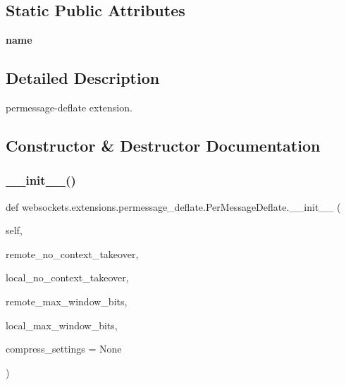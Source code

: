 \subsection*{Static Public Attributes}
\begin{DoxyCompactItemize}
\item 
\mbox{\label{classwebsockets_1_1extensions_1_1permessage__deflate_1_1_per_message_deflate_ab265c97dca6d0d7fb8a12ccf98b4af31}} 
{\bfseries name}
\end{DoxyCompactItemize}


\subsection{Detailed Description}
\begin{DoxyVerb}permessage-deflate extension.\end{DoxyVerb}
 

\subsection{Constructor \& Destructor Documentation}
\mbox{\label{classwebsockets_1_1extensions_1_1permessage__deflate_1_1_per_message_deflate_a2e17b81a09635b8939bce43bf56274ef}} 
\subsubsection{\texorpdfstring{\+\_\+\+\_\+init\+\_\+\+\_\+()}{\_\_init\_\_()}}
{\footnotesize\ttfamily def websockets.\+extensions.\+permessage\+\_\+deflate.\+Per\+Message\+Deflate.\+\_\+\+\_\+init\+\_\+\+\_\+ (\begin{DoxyParamCaption}\item[{}]{self,  }\item[{}]{remote\+\_\+no\+\_\+context\+\_\+takeover,  }\item[{}]{local\+\_\+no\+\_\+context\+\_\+takeover,  }\item[{}]{remote\+\_\+max\+\_\+window\+\_\+bits,  }\item[{}]{local\+\_\+max\+\_\+window\+\_\+bits,  }\item[{}]{compress\+\_\+settings = {\ttfamily None} }\end{DoxyParamCaption})}

